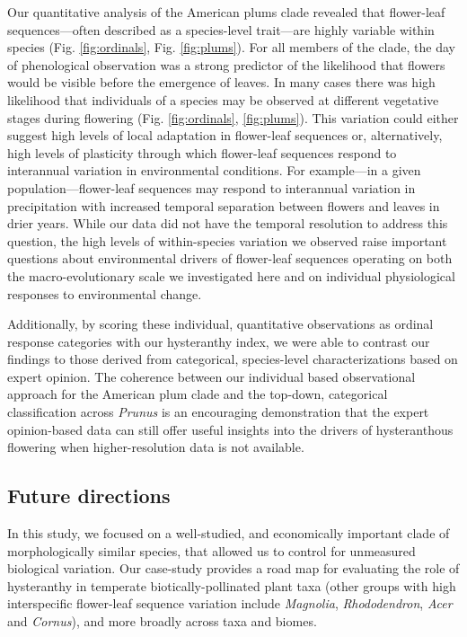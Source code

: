 \documentclass{article}[12pt]
\begin{document}
{Our quantitative analysis of the American plums clade revealed that flower-leaf sequences---often described as a species-level trait---are highly variable within species (Fig. \ref{fig:ordinals}, Fig. \ref{fig:plums}). For all members of the clade, the day of phenological observation was a strong predictor of the likelihood that flowers would be visible before the emergence of leaves. In many cases there was high likelihood that individuals of a species may be observed at different vegetative stages during flowering (Fig. \ref{fig:ordinals}, \ref{fig:plums}). This variation could either suggest high levels of local adaptation in flower-leaf sequences or, alternatively, high levels of plasticity through which flower-leaf sequences respond to interannual variation in environmental conditions. For example---in a given population---flower-leaf sequences may respond to interannual variation in precipitation with increased temporal separation between flowers and leaves in drier years. While our data did not have the temporal resolution to address this question, the high levels of within-species variation we observed raise important questions about environmental drivers of flower-leaf sequences operating on both the macro-evolutionary scale we investigated here and on individual physiological responses to environmental change. 

Additionally, by scoring these individual, quantitative observations as ordinal response categories with our hysteranthy index, we were able to contrast our findings to those derived from categorical, species-level characterizations based on expert opinion. The coherence between our individual based observational approach for the American plum clade and the top-down, categorical classification across \emph{Prunus} is an encouraging demonstration that the expert opinion-based data can still offer useful insights into the drivers of hysteranthous flowering when higher-resolution data is not available. 

\subsection*{Future directions}

In this study, we focused on a well-studied, and economically important clade of morphologically similar species, that allowed us to control for unmeasured biological variation. Our case-study provides a road map for evaluating the role of hysteranthy in temperate biotically-pollinated plant taxa (other groups with high interspecific flower-leaf sequence variation include \emph{Magnolia}, \emph{Rhododendron}, \emph{Acer} and \emph{Cornus}), and more broadly across taxa and biomes.

}
\end{document}
